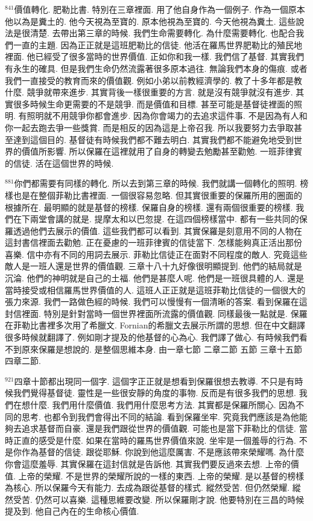 \documentclass{book}
\begin{document}
$^{841}$價值轉化.
肥勒比書.
特別在三章裡面.
用了他自身作為一個例子.
作為一個原本他以為是糞土的.
他今天視為至寶的.
原本他視為至寶的.
今天他視為糞土.
這些說法是很清楚.
去帶出第三章的時候.
我們生命需要轉化.
為什麼需要轉化.
也配合我們一直的主題.
因為正正就是這班肥勒比的信徒.
他活在羅馬世界肥勒比的殖民地裡面.
他已經受了很多當時的世界價值.
正如你和我一樣.
我們信了基督.
其實我們有永生的確具.
但是我們生命仍然流露著很多原本過往.
無論我們本身的傷痕.
或者我們一直接受的教育而來的價值觀.
例如小弟以前教經濟學的.
教了十多年都是教什麼.
競爭就帶來進步.
其實背後一樣很重要的方言.
就是沒有競爭就沒有進步.
其實很多時候生命更需要的不是競爭.
而是價值和目標.
甚至可能是基督徒裡面的照明.
有照明就不用競爭你都會進步.
因為你會竭力的去追求這件事.
不是因為有人和你一起去跑去爭一些獎賞.
而是相反的因為這是上帝召我.
所以我要努力去爭取甚至達到這個目的.
基督徒有時候我們都不難去明白.
其實我們都不能避免地受到世界的價值所影響.
所以保羅在這裡就用了自身的轉變去勉勵甚至勸勉.
一班菲律賓的信徒.
活在這個世界的時候.

$^{881}$你們都需要有同樣的轉化.
所以去到第三章的時候.
我們就講一個轉化的照明.
榜樣也是在整個菲勒比書裡面.
一個很容易忽略.
但其實很重要的保羅所用的圈面的根據所在.
最明顯的就是基督的榜樣.
保羅自身的榜樣.
還有兩個很重要的榜樣.
我們在下兩堂會講的就是.
提摩太和以巴忽提.
在這四個榜樣當中.
都有一些共同的保羅透過他們去展示的價值.
這些我們都可以看到.
其實保羅是刻意用不同的人物在這封書信裡面去勸勉.
正在憂慮的一班菲律賓的信徒當下.
怎樣能夠真正活出那份喜樂.
信中亦有不同的用詞去展示.
菲勒比信徒正在面對不同程度的敵人.
究竟這些敵人是一班人還是世界的價值觀.
三章十八十九好像很明顯提到.
他們的結局就是沉淪.
他們的神明就是自己的土福.
他們是甚麼人呢.
他們是一班很具體的人.
還是當時接受或相信羅馬世界價值的人.
這班人正正就是這班菲勒比信徒的一個很大的張力來源.
我們一路做色經的時候.
我們可以慢慢有一個清晰的答案.
看到保羅在這封信裡面.
特別是針對當時一個世界裡面所流露的價值觀.
同樣最後一點就是.
保羅在菲勒比書裡多次用了希臘文.
Fornian的希臘文去展示所謂的思想.
但在中文翻譯很多時候就翻譯了.
例如剛才提及的他基督的心為心.
我們譯了做心.
有時候我們看不到原來保羅是想說的.
是整個思維本身.
由一章七節 二章二節 五節 三章十五節 四章二節.

$^{921}$四章十節都出現同一個字.
這個字正正就是想看到保羅很想去教導.
不只是有時候我們覺得基督徒.
靈性是一些很安靜的角度的事物.
反而是有很多我們的思想.
我們在想什麼.
我們用什麼價值.
我們用什麼思考方法.
其實都是保羅所關心.
因為不同的思考.
也都令到我們會得出不同的結論.
看到保羅坐牢.
究竟我們應該是為他能夠去追求基督而自豪.
還是我們跟從世界的價值觀.
可能也是當下菲勒比的信徒.
當時正直的感受是什麼.
如果在當時的羅馬世界價值來說.
坐牢是一個羞辱的行為.
不是你作為基督的信徒.
跟從耶穌.
你說到他這麼厲害.
不是應該帶來榮耀嗎.
為什麼你會這麼羞辱.
其實保羅在這封信就是告訴他.
其實我們要反過來去想.
上帝的價值.
上帝的榮耀.
不是世界的榮耀所說的一樣的東西.
上帝的榮耀.
是以基督的榜樣為核心.
所以保羅今天有能力.
去成為跟從基督的樣式.
縱然受苦.
但仍然榮耀.
縱然受苦.
仍然可以喜樂.
這種思維要改變.
所以保羅剛才說.
他要特別在三昌的時候提及到.
他自己內在的生命核心價值.
\end{document}
